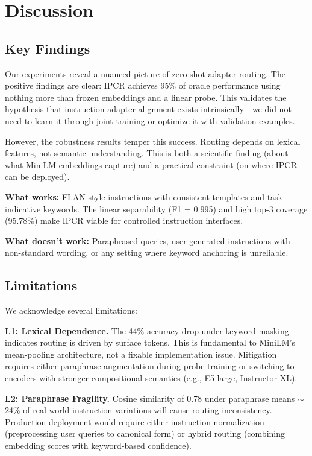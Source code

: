 \section{Discussion}
\label{sec:discussion}

\subsection{Key Findings}

Our experiments reveal a nuanced picture of zero-shot adapter routing. The positive findings are clear: IPCR achieves 95\% of oracle performance using nothing more than frozen embeddings and a linear probe. This validates the hypothesis that instruction-adapter alignment exists intrinsically---we did not need to learn it through joint training or optimize it with validation examples.

However, the robustness results temper this success. Routing depends on lexical features, not semantic understanding. This is both a scientific finding (about what MiniLM embeddings capture) and a practical constraint (on where IPCR can be deployed).

\textbf{What works:} FLAN-style instructions with consistent templates and task-indicative keywords. The linear separability (F1 = 0.995) and high top-3 coverage (95.78\%) make IPCR viable for controlled instruction interfaces.

\textbf{What doesn't work:} Paraphrased queries, user-generated instructions with non-standard wording, or any setting where keyword anchoring is unreliable.

\subsection{Limitations}

We acknowledge several limitations:

\textbf{L1: Lexical Dependence.} The 44\% accuracy drop under keyword masking indicates routing is driven by surface tokens. This is fundamental to MiniLM's mean-pooling architecture, not a fixable implementation issue. Mitigation requires either paraphrase augmentation during probe training or switching to encoders with stronger compositional semantics (e.g., E5-large, Instructor-XL).

\textbf{L2: Paraphrase Fragility.} Cosine similarity of 0.78 under paraphrase means $\sim$24\% of real-world instruction variations will cause routing inconsistency. Production deployment would require either instruction normalization (preprocessing user queries to canonical form) or hybrid routing (combining embedding scores with keyword-based confidence).

